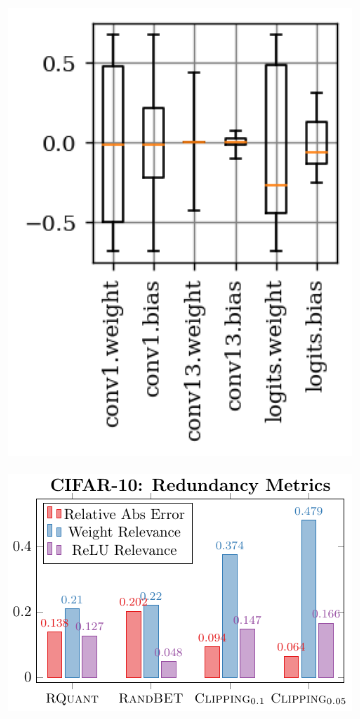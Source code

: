\begin{figure}[t]
\begin{subfigure}{0.16\textwidth}
		\includegraphics[width=1\textwidth]{c10_weights_q801auunrfp_nt__1p_fixedgn.png}
	\end{subfigure}
	\begin{subfigure}{0.35\textwidth}
		\includegraphics[width=1\textwidth]{c10_clipping}

\end{subfigure}
\end{figure}
